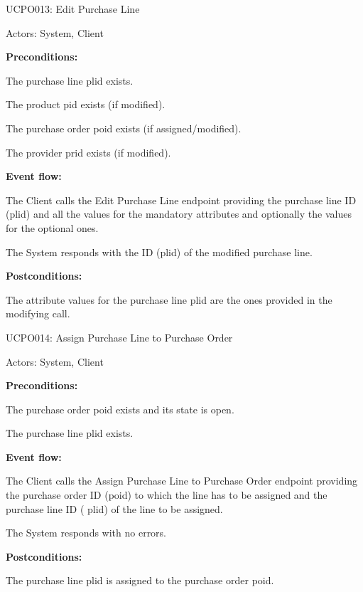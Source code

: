 \begin{ucbox}{UCPO013: Edit Purchase Line}
\label{UCPO013}

Actors: System, Client

\textbf{Preconditions:}

\ucitem The purchase line plid exists.

\ucitem The product pid exists (if modified).

\ucitem The purchase order poid exists (if assigned/modified).

\ucitem The provider prid exists (if modified).

\textbf{Event flow:}

\ucitem The Client calls the Edit Purchase Line endpoint providing the purchase line ID (plid) and all the values for the mandatory attributes and optionally the values for the 
optional ones.

\ucitem The System responds with the ID (plid) of the modified purchase line.

\textbf{Postconditions:}

\ucitem The attribute values for the purchase line plid are the ones provided in the modifying call.

\end{ucbox}

\begin{ucbox}{UCPO014: Assign Purchase Line to Purchase Order}
\label{UCPO014}

Actors: System, Client

\textbf{Preconditions:}

\ucitem The purchase order poid exists and its state is open.

\ucitem The purchase line plid exists.

\textbf{Event flow:}

\ucitem The Client calls the Assign Purchase Line to Purchase Order endpoint providing the purchase order ID (poid) to which the line has to be assigned and the purchase line ID (
plid) of the line to be assigned.

\ucitem The System responds with no errors.

\textbf{Postconditions:}

\ucitem The purchase line plid is assigned to the purchase order poid.

\end{ucbox}

